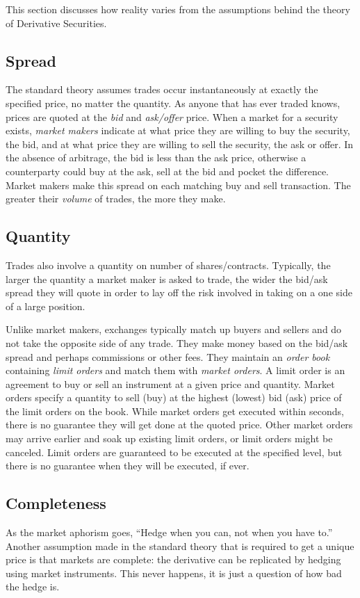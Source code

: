 This section discusses how reality varies from the assumptions behind
the theory of Derivative Securities.

\subsection{Spread}
The standard theory assumes trades occur instantaneously at exactly
the specified price, no matter the quantity.  As anyone that has ever
traded knows, prices are quoted at the {\em bid} and {\em ask/offer}
price. When a market for a security exists, {\em market makers} indicate
at what price they are willing to buy the security, the bid, and at what
price they are willing to sell the security, the ask or offer. In the
absence of arbitrage, the bid is less than the ask price, otherwise
a counterparty could buy at the ask, sell at the bid and pocket the
difference.  Market makers make this spread on each matching buy and sell
transaction. The greater their {\em volume} of trades, the more they make.

\subsection{Quantity}
Trades also involve a quantity on number of shares/contracts. Typically,
the larger the quantity a market maker is asked to trade, the wider the
bid/ask spread they will quote in order to lay off the risk involved in
taking on a one side of a large position.

Unlike market makers, exchanges typically match up buyers and sellers and
do not take the opposite side of any trade. They make money based on the
bid/ask spread and perhaps commissions or other fees. They maintain an
{\em order book} containing {\em limit orders} and match them with {\em
market orders}. A limit order is an agreement to buy or sell an instrument
at a given price and quantity. Market orders specify a quantity to sell
(buy) at the highest (lowest) bid (ask) price of the limit orders on
the book.  While market orders get executed within seconds, there is no
guarantee they will get done at the quoted price. Other market orders may
arrive earlier and soak up existing limit orders, or limit orders might
be canceled.  Limit orders are guaranteed to be executed at the specified
level, but there is no guarantee when they will be executed, if ever.

\subsection{Completeness}
As the market aphorism goes, ``Hedge when you can, not when you have
to.''  Another assumption made in the standard theory that is required
to get a unique price is that markets are complete: the derivative can
be replicated by hedging using market instruments. This never happens,
it is just a question of how bad the hedge is.

